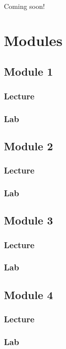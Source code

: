 \documentclass[
]{book}
\begin{document}
Coming soon!

\part{Modules}\label{part-modules}

\chapter{Module 1}\label{module-1}

\section{Lecture}\label{lecture}

\section{Lab}\label{lab}

\chapter{Module 2}\label{module-2}

\section{Lecture}\label{lecture-1}

\section{Lab}\label{lab-1}

\chapter{Module 3}\label{module-3}

\section{Lecture}\label{lecture-2}

\section{Lab}\label{lab-2}

\chapter{Module 4}\label{module-4}

\section{Lecture}\label{lecture-3}

\section{Lab}\label{lab-3}

  
\end{document}
